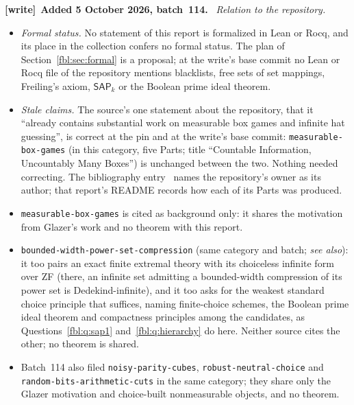 \documentclass[11pt]{article}
\theoremstyle{definition}
\theoremstyle{remark}
\newcommand{\SAP}{\mathsf{SAP}}
\newcommand{\file}[1]{\nolinkurl{#1}}
\newenvironment{writenote}[1][]{\par\smallskip\begingroup\small
 \noindent\textbf{[write]}\if\relax\detokenize{#1}\relax\else~\textbf{#1.}\fi\ }%
 {\par\endgroup\smallskip}
\begin{document}
\begin{writenote}[Added 5 October 2026, batch~114]
\emph{Relation to the repository.}
\begin{itemize}\raggedright
\item \emph{Formal status.} No statement of this report is formalized in
 Lean or Rocq, and its place in the collection confers no formal status.
 The plan of Section~\ref{fbl:sec:formal} is a proposal; at the write's base
 commit no Lean or Rocq file of the repository mentions blacklists, free
 sets of set mappings, Freiling's axiom, $\SAP_k$ or the Boolean prime ideal theorem.
\item \emph{Stale claims.} The source's one statement about the repository,
 that it ``already contains substantial work on measurable box games and
 infinite hat guessing'', is correct at the pin and at the write's base
 commit: \file{measurable-box-games} (in this category, five Parts; title
 ``Countable Information, Uncountably Many Boxes'') is unchanged between the
 two. Nothing needed correcting. The bibliography entry~\cite{ProveItBoxes}
 names the repository's owner as its author; that report's README records
 how each of its Parts was produced.
\item \file{measurable-box-games} is cited as background only: it shares the
 motivation from Glazer's work and no theorem with this report.
\item \file{bounded-width-power-set-compression} (same category and batch;
 \emph{see also}): it too pairs an exact finite extremal theory with its
 choiceless infinite form over ZF (there, an infinite set admitting a
 bounded-width compression of its power set is Dedekind-infinite), and it
 too asks for the weakest standard choice principle that suffices, naming
 finite-choice schemes, the Boolean prime ideal theorem and compactness
 principles among the candidates, as Questions~\ref{fbl:q:sap1}
 and~\ref{fbl:q:hierarchy} do here. Neither source cites the other; no
 theorem is shared.
\item Batch~114 also filed \file{noisy-parity-cubes},
 \file{robust-neutral-choice} and \file{random-bits-arithmetic-cuts} in the
 same category; they share only the Glazer motivation and choice-built
 nonmeasurable objects, and no theorem.
\end{itemize}
\end{writenote}
\end{document}
